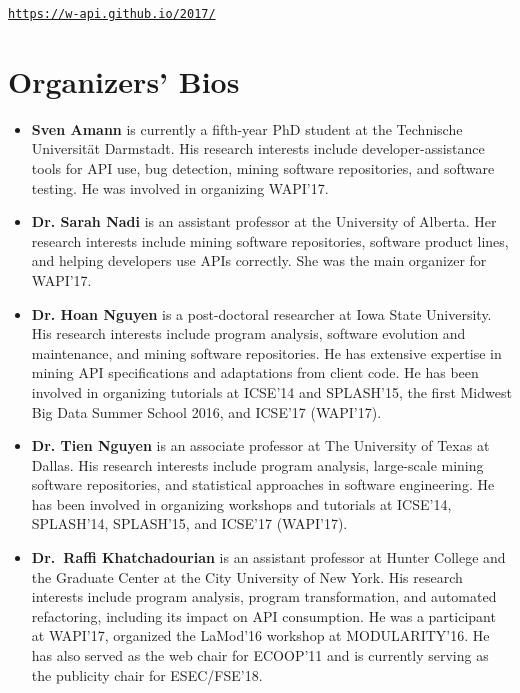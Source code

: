 \documentclass[sigconf]{acmart}
\begin{document}
\begin{center}
  \texttt{\url{https://w-api.github.io/2017/}}
\end{center}

\section{Organizers' Bios}
\begin{itemize}
\setlength\itemsep{5pt}
\item \textbf{Sven Amann} is currently a fifth-year PhD student at the Technische Universit\"{a}t Darmstadt. His research interests include developer-assistance tools for API use, bug detection, mining software repositories, and software testing. He was involved in organizing WAPI'17.

\item \textbf{Dr. Sarah Nadi} is an assistant professor at the University of Alberta. Her research interests include mining software repositories, software product lines, and helping developers use APIs correctly. She was the main organizer for WAPI'17.

\item \textbf{Dr. Hoan Nguyen} is a post-doctoral researcher at Iowa State University. His research interests include program analysis, software evolution and maintenance, and mining software repositories. He has extensive expertise in mining API specifications and adaptations from client code. He has been involved in organizing tutorials at ICSE'14 and SPLASH'15, the first Midwest Big Data Summer School 2016, and ICSE'17 (WAPI'17).

\item \textbf{Dr. Tien Nguyen} is an associate professor at The University of Texas at Dallas. His research interests include program analysis, large-scale mining software repositories, and statistical approaches in software engineering. He has been involved in organizing workshops and tutorials at ICSE'14, SPLASH'14, SPLASH'15, and ICSE'17 (WAPI'17).

\item \textbf{Dr.~Raffi Khatchadourian} is an assistant professor at Hunter College and the Graduate Center at the City University of New York. His research interests include program analysis, program transformation, and automated refactoring, including its impact on API consumption. He was a participant at WAPI'17, organized the LaMod'16 workshop at MODULARITY'16. He has also served as the web chair for ECOOP'11 and is currently serving as the publicity chair for ESEC/FSE'18.
\end{itemize}
\end{document}
